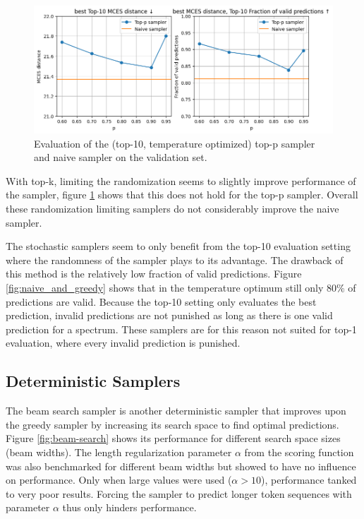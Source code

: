 \begin{figure}[h]
    \centering
    \includegraphics[width=1.0\textwidth]{figures/results/samplers/top-p.png}
    \caption{Evaluation of the (top-10, temperature optimized) top-p sampler and naive sampler on the validation set.}
    \label{fig:top-p}
\end{figure}

With top-k, limiting the randomization seems to slightly improve performance of the sampler, figure \ref{fig:top-p} shows that this does not hold for the top-p sampler.
Overall these randomization limiting samplers do not considerably improve the naive sampler.

The stochastic samplers seem to only benefit from the top-10 evaluation setting where the randomness of the sampler plays to its advantage.
The drawback of this method is the relatively low fraction of valid predictions.
Figure \ref{fig:naive_and_greedy} shows that in the temperature optimum still only $80\%$ of predictions are valid.
Because the top-10 setting only evaluates the best prediction, invalid predictions are not punished as long as there is one valid prediction for a spectrum.
These samplers are for this reason not suited for top-1 evaluation, where every invalid prediction is punished.

\subsection{Deterministic Samplers}

The beam search sampler is another deterministic sampler that improves upon the greedy sampler by increasing its search space to find optimal predictions.
Figure \ref{fig:beam-search} shows its performance for different search space sizes (beam widths).
The length regularization parameter $\alpha$ from the scoring function was also benchmarked for different beam widths but showed to have no influence on performance.
Only when large values were used ($\alpha > 10$), performance tanked to very poor results.
Forcing the sampler to predict longer token sequences with parameter $\alpha$ thus only hinders performance.

